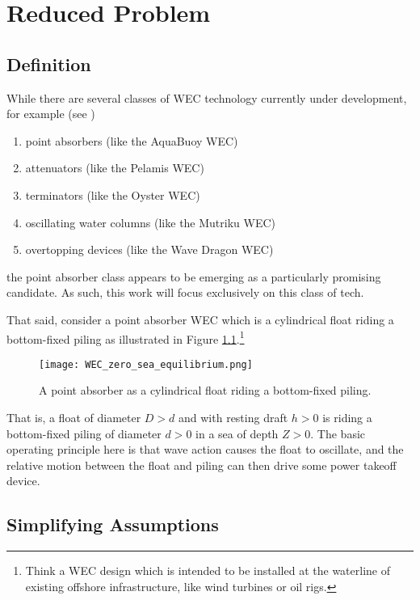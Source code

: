\chapter{Reduced Problem}

\section{Definition}

While there are several classes of WEC technology currently under development, for example (see \cite{Zhang_2021})

\begin{enumerate}
	\item point absorbers (like the AquaBuoy WEC)
	\item attenuators (like the Pelamis WEC)
	\item terminators (like the Oyster WEC)
	\item oscillating water columns (like the Mutriku WEC)
	\item overtopping devices (like the Wave Dragon WEC)
\end{enumerate}

\noindent the point absorber class appears to be emerging as a particularly promising candidate. As such, this work will focus exclusively on this class of tech. \par 
That said, consider a point absorber WEC which is a cylindrical float riding a bottom-fixed piling as illustrated in Figure \ref{fig:WEC_reduced_problem}.\footnote{Think a WEC design which is intended to be installed at the waterline of existing offshore infrastructure, like wind turbines or oil rigs.}

\begin{figure}[H]
    \centering
    \texttt{[image: WEC\_zero\_sea\_equilibrium.png]}
    \caption{A point absorber as a cylindrical float riding a bottom-fixed piling.}
    \label{fig:WEC_reduced_problem}
\end{figure}

\noindent That is, a float of diameter $D>d$ and with resting draft $h>0$ is riding a bottom-fixed piling of diameter $d>0$ in a sea of depth $Z>0$. The basic operating principle here is that wave action causes the float to oscillate, and the relative motion between the float and piling can then drive some power takeoff device.

\section{Simplifying Assumptions}

